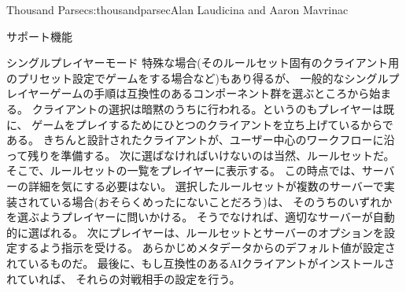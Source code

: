 \begin{aosachapter}{Thousand Parsec}{s:thousandparsec}{Alan Laudicina and Aaron Mavrinac}
\begin{aosasect1}{サポート機能}
\begin{aosasect2}{シングルプレイヤーモード}
特殊な場合(そのルールセット固有のクライアント用のプリセット設定でゲームをする場合など)もあり得るが、
一般的なシングルプレイヤーゲームの手順は互換性のあるコンポーネント群を選ぶところから始まる。
クライアントの選択は暗黙のうちに行われる。というのもプレイヤーは既に、
ゲームをプレイするためにひとつのクライアントを立ち上げているからである。
きちんと設計されたクライアントが、ユーザー中心のワークフローに沿って残りを準備する。
次に選ばなければいけないのは当然、ルールセットだ。そこで、ルールセットの一覧をプレイヤーに表示する。
この時点では、サーバーの詳細を気にする必要はない。
選択したルールセットが複数のサーバーで実装されている場合(おそらくめったにないことだろう)は、
そのうちのいずれかを選ぶようプレイヤーに問いかける。
そうでなければ、適切なサーバーが自動的に選ばれる。
次にプレイヤーは、ルールセットとサーバーのオプションを設定するよう指示を受ける。
あらかじめメタデータからのデフォルト値が設定されているものだ。
最後に、もし互換性のあるAIクライアントがインストールされていれば、
それらの対戦相手の設定を行う。


\end{aosasect2}
\end{aosasect1}
\end{aosachapter}
